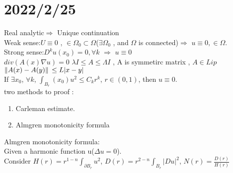\section{2022/2/25}

Real analytic$\Rightarrow$ Unique continuation
\\
Weak sense:$U\equiv 0$ , $\in \Omega_0\subset\Omega$($\exists \Omega_0$ , and $\Omega$ is connected)$\Rightarrow$ $u\equiv 0 , \in \Omega$.
\\
Strong sense:$D^k u(x_0)=0 , \forall k$ $\Rightarrow $ $u\equiv 0$
\\
$div(A(x)\nabla u)=0$  $\lambda I\leq A\leq \Lambda I$ , A is symmetirc matrix , $A\in Lip$ $\norm*{A(x)-A(y)}\leq L\abs*{x-y}$
\\
If $\exists x_0$, $\forall k$, $\int_{B_r}(x_0)u^2\leq C_k r^k$, $r\in (0,1)$, then $u\equiv 0$.
\\
two methods to proof :
\begin{enumerate}
    \item Carleman estimate.
    \item Almgren monotonicity formula
\end{enumerate}

Almgren monotonicity formula:
\\
Given a harmonic function u($\Delta u =0$).
\\Consider $H(r)=r^{1-n}\int_{\partial B_r}u^2$, $D(r)=r^{2-n}\int_{B_r}|Du|^2$, $N(r)=\frac{D(r)}{H(r)}$